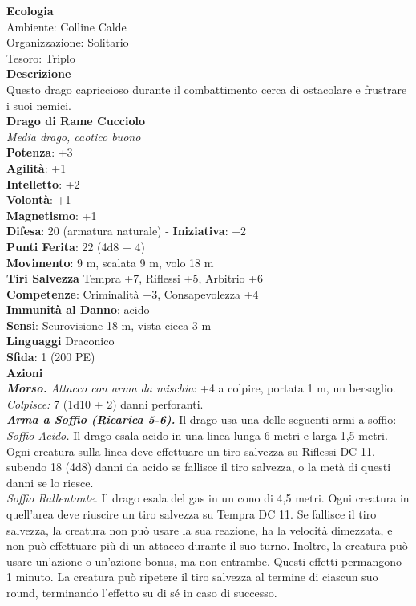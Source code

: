 \begin{multicols}{2}
\textbf{Ecologia}\\
Ambiente: Colline Calde\\
Organizzazione: Solitario\\
Tesoro: Triplo\\
\textbf{Descrizione}\\
Questo drago capriccioso durante il combattimento cerca di ostacolare e frustrare i suoi nemici.\\


\medskip\textbf{Drago di Rame Cucciolo}\\
\emph{Media drago, caotico buono}\\
\textbf{Potenza}: +3\\
\textbf{Agilità}: +1\\
\textbf{Intelletto}: +2\\
\textbf{Volontà}: +1\\
\textbf{Magnetismo}: +1\\
\textbf{Difesa}: 20 (armatura naturale) - \textbf{Iniziativa}: +2\\
\textbf{Punti Ferita}: 22 (4d8 + 4)\\
\textbf{Movimento}: 9 m, scalata 9 m, volo 18 m\\
\textbf{Tiri Salvezza} Tempra +7, Riflessi +5, Arbitrio +6\\
\textbf{Competenze}: Criminalità +3, Consapevolezza +4\\
\textbf{Immunità al Danno}: acido\\
\textbf{Sensi}: Scurovisione 18 m, vista cieca 3 m\\
\textbf{Linguaggi} Draconico\\
\textbf{Sfida}: 1 (200 PE)\smallskip\\
\smallskip\textbf{Azioni}\\
\emph{\textbf{Morso.} Attacco con arma da mischia}: +4 a colpire, portata 1 m, un bersaglio.\\
\emph{Colpisce:} 7 (1d10 + 2) danni perforanti.\\
\emph{\textbf{Arma a Soffio (Ricarica 5-6).}} Il drago usa una delle seguenti armi a soffio:\\
\emph{Soffio Acido.} Il drago esala acido in una linea lunga 6 metri e larga 1,5 metri. Ogni creatura sulla linea deve effettuare un tiro salvezza su Riflessi DC 11, subendo 18 (4d8) danni da acido se fallisce il tiro salvezza, o la metà di questi danni se lo riesce.\\
\emph{Soffio Rallentante.} Il drago esala del gas in un cono di 4,5 metri. Ogni creatura in quell'area deve riuscire un tiro salvezza su Tempra DC 11. Se fallisce il tiro salvezza, la creatura non può usare la sua reazione, ha la velocità dimezzata, e non può effettuare più di un attacco durante il suo turno. Inoltre, la creatura può usare un'azione o un'azione bonus, ma non entrambe. Questi effetti permangono 1 minuto. La creatura può ripetere il tiro salvezza al termine di ciascun suo round, terminando l'effetto su di sé in caso di successo.\\

\end{multicols}
